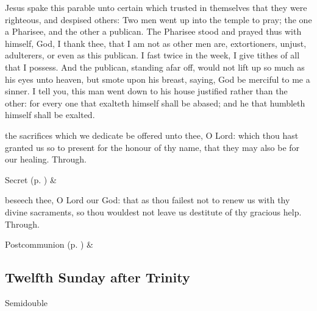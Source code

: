  Jesus spake this parable unto certain which trusted in themselves that they were righteous, and despised others: Two men went up into the temple to pray; the one a Pharisee, and the other a publican. The Pharisee stood and prayed thus with himself, God, I thank thee, that I am not as other men are, extortioners, unjust, adulterers, or even as this publican. I fast twice in the week, I give tithes of all that I possess. And the publican, standing afar off, would not lift up so much as his eyes unto heaven, but smote upon his breast, saying, God be merciful to me a sinner. I tell you, this man went down to his house justified rather than the other: for every one that exalteth himself shall be abased; and he that humbleth himself shall be exalted.


\secret
{} the sacrifices which we dedicate be offered unto thee, O Lord: which thou hast granted us so to present for the honour of thy name, that they may also be for our healing. Through.
\begin{rubric}
     Secret  (p. \pageref{SPSaints}) \&  
\end{rubric}


\postcommunion
{} beseech thee, O Lord our God: that as thou failest not to renew us with thy divine sacraments, so thou wouldest not leave us destitute of thy gracious help. Through.
\begin{rubric}
     Postcommunion  (p. \pageref{SPSaints}) \&  
\end{rubric}


\clearpage
\subsection{Twelfth Sunday after Trinity}
\begin{inhead}
{Semidouble}
\end{inhead}

